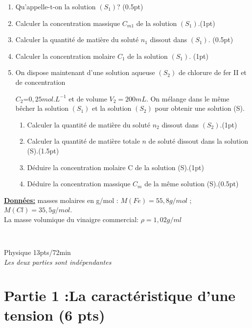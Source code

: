 \documentclass[12pt]{article}
\begin{document}
\begin{enumerate}
    \item Qu’appelle-t-on la solution $(S_1)$? \dotfill(0.5pt)
    \item Calculer la concentration massique $C_{m1}$ de la solution $(S_1)$.\dotfill(1pt)
    \item Calculer la quantité de matière du soluté $n_1$ dissout dans $(S_1)$. \dotfill(0.5pt)
    \item Calculer la concentration molaire $C_1$ de la solution $(S_1)$. \dotfill(1pt)
    \item On dispose maintenant d’une solution aqueuse $(S_2)$ de chlorure de fer II et de concentration 

		$C_2$=$0,25mol.L^{-1}$ et de volume $V_2 = 200 mL$. On mélange dans le même bêcher la solution $(S_1)$ et la solution $(S_2)$ pour obtenir une solution (S).
        \begin{enumerate}
            \item  Calculer la quantité de matière du soluté $n_2$ dissout dans $(S_2)$.\dotfill(1pt)
            \item Calculer la quantité de matière totale $n$ de soluté dissout dans la solution (S).\dotfill(1.5pt)
            \item Déduire la concentration molaire C de la solution (S).\dotfill(1pt)
            \item Déduire la concentration massique $C_m$ de la même solution (S).\dotfill(0.5pt)
        \end{enumerate}
    \end{enumerate}
\textbf{\underline{Données:} }
masses molaires en g/mol : $M(Fe) = 55,8g/mol$ ; $M(Cl)= 35,5g/mol$.
\\La masse volumique du vinaigre commercial: $\rho = 1,02 g/ml$

\hrulefill\\
\begin{center}
\hrulefill
\Large{Physique 13pts/72min}
\hrulefill\\
    \emph{Les deux parties sont indépendantes}
\end{center}

 \section*{Partie 1 :La caractéristique d'une tension \dotfill(6 pts)}
\end{document}
